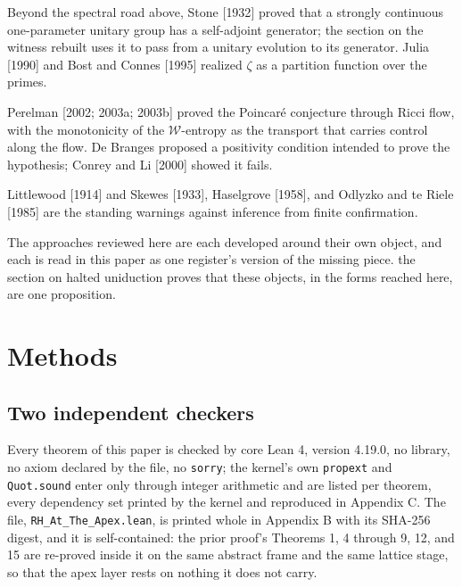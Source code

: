 \documentclass[10pt,twocolumn]{article}
\begin{document}
Beyond the spectral road above, Stone {[}1932{]} proved that a strongly
continuous one-parameter unitary group has a self-adjoint generator; the
section on the witness rebuilt uses it to pass from a unitary evolution
to its generator. Julia {[}1990{]} and Bost and Connes {[}1995{]}
realized \(\zeta\) as a partition function over the primes.

Perelman {[}2002; 2003a; 2003b{]} proved the Poincaré conjecture through
Ricci flow, with the monotonicity of the \(\mathcal W\)-entropy as the
transport that carries control along the flow. De Branges proposed a
positivity condition intended to prove the hypothesis; Conrey and Li
{[}2000{]} showed it fails.

Littlewood {[}1914{]} and Skewes {[}1933{]}, Haselgrove {[}1958{]}, and
Odlyzko and te Riele {[}1985{]} are the standing warnings against
inference from finite confirmation.

The approaches reviewed here are each developed around their own object,
and each is read in this paper as one register's version of the missing
piece. the section on halted uniduction proves that these objects, in
the forms reached here, are one proposition.

\hypertarget{methods}{%
\section{Methods}\label{methods}}

\hypertarget{two-independent-checkers}{%
\subsection{Two independent checkers}\label{two-independent-checkers}}

Every theorem of this paper is checked by core Lean 4, version 4.19.0,
no library, no axiom declared by the file, no \texttt{sorry}; the
kernel's own \texttt{propext} and \texttt{Quot.sound} enter only through
integer arithmetic and are listed per theorem, every dependency set
printed by the kernel and reproduced in Appendix C. The file,
\texttt{RH\_At\_The\_Apex.lean}, is printed whole in Appendix B with its
SHA-256 digest, and it is self-contained: the prior proof's Theorems 1,
4 through 9, 12, and 15 are re-proved inside it on the same abstract
frame and the same lattice stage, so that the apex layer rests on
nothing it does not carry.
\end{document}

